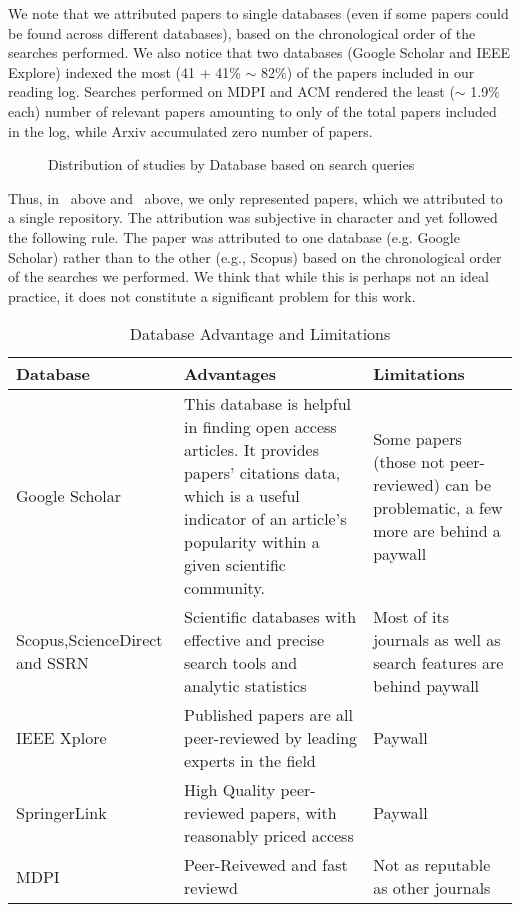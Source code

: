 \documentclass[11pt]{article}
\begin{document}
We note that we attributed papers to single databases (even if some papers could be found across different databases), based on the chronological order of the searches performed. We also notice that two databases (Google Scholar and IEEE Explore) indexed the most (41 + 41\% $\sim$ 82\%) of the papers included in our reading log. Searches performed on MDPI and ACM rendered the least ($\sim$ 1.9\% each) number of relevant papers amounting to only of the total papers included in the log, while Arxiv accumulated zero number of papers.

\begin{figure}
   \resizebox{\columnwidth}{!}{
    
    }
    \caption{Distribution of studies by Database based on search queries}
    \label{F:databasedistribution}
\end{figure}

Thus, in~ above and~ above, we only represented papers, which we attributed to a single repository. The attribution was subjective in character and yet followed the following rule. The paper was attributed to one database (e.g. Google Scholar) rather than to the other (e.g., Scopus) based on the chronological order of the searches we performed. We think that while this is perhaps not an ideal practice, it does not constitute a significant problem for this work. 

\begin{table}
\caption{Database Advantage and Limitations}
\label{T:databaseadvantageandlimitations}
\begin{tabular}{ l  p{3.4cm}  p{3.4cm} }
        \toprule
\textbf{Database}      
& \textbf{Advantages}   
& \textbf{Limitations}   \\
\midrule
Google Scholar & This database is helpful in finding open access articles. It provides papers’ citations data, which is a useful indicator of an article’s popularity within a given scientific community. & Some papers (those not peer-reviewed) can be problematic, a few more are behind a paywall  \\
Scopus,ScienceDirect and SSRN & Scientific databases with effective and precise search tools and analytic statistics &  Most of its journals as well as search features are behind paywall  \\
 IEEE Xplore & Published papers are all peer-reviewed by leading experts in the field & Paywall  \\
 SpringerLink & High Quality peer-reviewed papers, with reasonably priced access & Paywall  \\
 MDPI & Peer-Reivewed and fast reviewd & Not as reputable as other journals \\

\bottomrule
\end{tabular}
\end{table}
\end{document}
